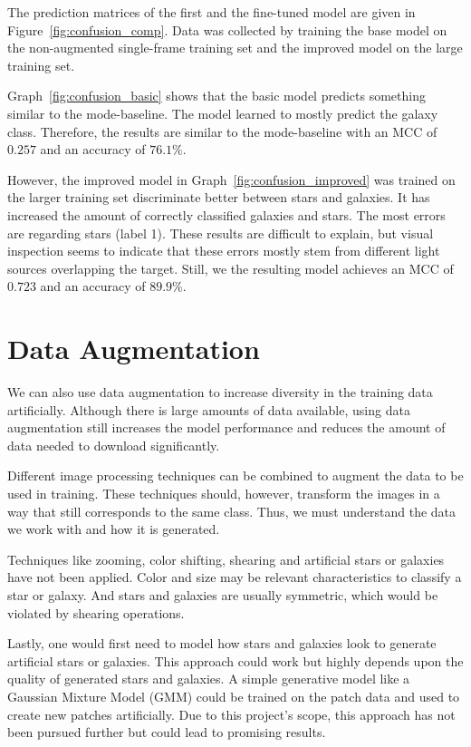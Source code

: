 \documentclass[
a4paper,     %
10pt         %
]{scrartcl}  %
\begin{document}
The prediction matrices of the first and the fine-tuned model are given in Figure~\ref{fig:confusion_comp}.
Data was collected by training the base model on the non-augmented single-frame training set and the improved model on the large training set.

Graph~\ref{fig:confusion_basic} shows that the basic model predicts something similar to the mode-baseline.
The model learned to mostly predict the galaxy class.
Therefore, the results are similar to the mode-baseline with an MCC of $0.257$ and an accuracy of $76.1\%$.

However, the improved model in Graph~\ref{fig:confusion_improved} was trained on the larger training set discriminate better between stars and galaxies.
It has increased the amount of correctly classified galaxies and stars.
The most errors are regarding stars (label 1).
These results are difficult to explain, but visual inspection seems to indicate that these errors mostly stem from different light sources overlapping the target.
Still, we the resulting model achieves an MCC of $0.723$ and an accuracy of $89.9\%$.

\section{Data Augmentation}
We can also use data augmentation to increase diversity in the training data artificially.
Although there is large amounts of data available, using data augmentation still increases the model performance and reduces the amount of data needed to download significantly.

Different image processing techniques can be combined to augment the data to be used in training.
These techniques should, however, transform the images in a way that still corresponds to the same class.
Thus, we must understand the data we work with and how it is generated.

Techniques like zooming, color shifting, shearing and artificial stars or galaxies have not been applied.
Color and size may be relevant characteristics to classify a star or galaxy.
And stars and galaxies are usually symmetric, which would be violated by shearing operations.

Lastly, one would first need to model how stars and galaxies look to generate artificial stars or galaxies.
This approach could work but highly depends upon the quality of generated stars and galaxies.
A simple generative model like a Gaussian Mixture Model (GMM) could be trained on the patch data and used to create new patches artificially.
Due to this project's scope, this approach has not been pursued further but could lead to promising results.
\end{document}
